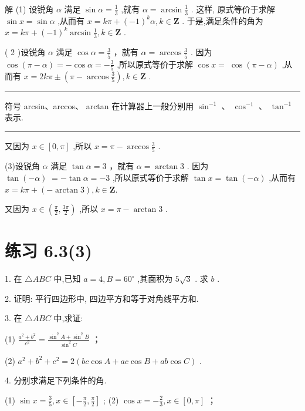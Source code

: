\documentclass[10pt]{article}
\newcommand{\HRule}{\begin{center}\rule{0.9\linewidth}{0.2mm}\end{center}}
\begin{document}
解 (1) 设锐角 \(\alpha\) 满足 \(\sin \alpha  = \frac{1}{3}\) ,就有 \(\alpha  = \arcsin \frac{1}{3}\) . 这样, 原式等价于求解 \(\sin x = \sin \alpha\) ,从而有 \(x = {k\pi } + {\left( -1\right) }^{k}\alpha ,k \in  \mathbf{Z}\) . 于是,满足条件的角为 \(x = {k\pi } + {\left( -1\right) }^{k}\arcsin \frac{1}{3},k \in  \mathbf{Z}\) .

( 2 )设锐角 \(\alpha\) 满足 \(\cos \alpha  = \frac{3}{5}\) ，就有 \(\alpha  = \arccos \frac{3}{5}\) . 因为 \(\cos \left( {\pi  - \alpha }\right)  =  - \cos \alpha  =  - \frac{3}{5}\) ,所以原式等价于求解 \(\cos x = \; \cos \left( {\pi  - \alpha }\right)\) ,从而有 \(x = {2k\pi } \pm  \left( {\pi  - \arccos \frac{3}{5}}\right) ,k \in  \mathbf{Z}\) .

\HRule

符号 arcsin、arccos、 arctan 在计算器上一般分别用 \({\sin }^{-1}\) 、 \({\cos }^{-1}\) 、 \({\tan }^{-1}\) 表示.

\HRule

又因为 \(x \in  \left\lbrack  {0,\pi }\right\rbrack\) ,所以 \(x = \pi  - \arccos \frac{3}{5}\) .

(3)设锐角 \(\alpha\) 满足 \(\tan \alpha  = 3\) ，就有 \(\alpha  = \arctan 3\) . 因为 \(\tan \left( {-\alpha }\right) \; =  - \tan \alpha  =  - 3\) ,所以原式等价于求解 \(\tan x = \tan \left( {-\alpha }\right)\) ,从而有 \(x = {k\pi } + \left( {-\arctan 3}\right) ,k \in  \mathbf{Z}.\)

又因为 \(x \in  \left( {\frac{\pi }{2},\frac{3\pi }{2}}\right)\) ,所以 \(x = \pi  - \arctan 3\) .

\section*{练习 6.3(3)}

1. 在 \(\bigtriangleup {ABC}\) 中,已知 \(a = 4,B = {60}^{ \circ  }\) ,其面积为 \(5\sqrt{3}\) . 求 \(b\) .

2. 证明: 平行四边形中, 四边平方和等于对角线平方和.

3. 在 \(\bigtriangleup {ABC}\) 中,求证:

(1) \(\frac{{a}^{2} + {b}^{2}}{{c}^{2}} = \frac{{\sin }^{2}A + {\sin }^{2}B}{{\sin }^{2}C}\) ；

(2) \({a}^{2} + {b}^{2} + {c}^{2} = 2\left( {{bc}\cos A + {ac}\cos B + {ab}\cos C}\right)\) .

4. 分别求满足下列条件的角.

(1) \(\sin x = \frac{3}{5},x \in  \left\lbrack  {-\frac{\pi }{2},\frac{\pi }{2}}\right\rbrack\) ; (2) \(\cos x =  - \frac{2}{3},x \in  \left\lbrack  {0,\pi }\right\rbrack\) ；
\end{document}

